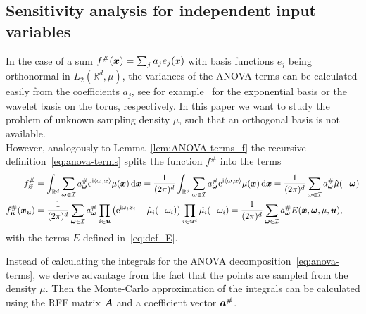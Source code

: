 \documentclass{article}
\renewcommand{\vec}[1]{\ensuremath \mathbf{\boldsymbol{#1}}}
\newcommand{\w}{\ensuremath{\vec \omega}}
\newcommand{\x}{\ensuremath{\vec x}}
\newcommand{\I}{\ensuremath{\mathcal{I}}}
\newcommand{\R}{\ensuremath{\mathbb{R}}}
\newcommand{\e}{\mathrm{e}}
\newcommand{\im}{\mathrm{i}}
\renewcommand{\d}{\, \mathrm{d}}
\theoremstyle{definition}
\numberwithin{equation}{section}
\begin{document}
\subsection{Sensitivity analysis for independent input variables }\label{sec:gsi1}
In the case of a sum $f^\#(\x) = \sum_j a_j e_j(x)$ with basis functions $e_j$ being orthonormal in $L_2(\R^d,\mu)$, the variances of the ANOVA terms can be calculated easily from the coefficients $a_j$, see for example~\cite{SchmischkeDiss,LiPoUl21} for the exponential basis or the wavelet basis on the torus, respectively. In this paper we want to study the problem of unknown sampling density $\mu$, such that an orthogonal basis is not available. \\ 
However, analogously to Lemma~\ref{lem:ANOVA-terms_f} the recursive definition~\eqref{eq:anova-terms} splits the function $f^\#$ into the terms
\begin{align*}
f^\#_{\varnothing} &= \int_{\R^d}  \sum_{\w\in \I} a^\#_{\w} \e^{\im\langle\w,\x\rangle }\mu(\x) \d \x= \frac{1}{(2\pi)^d}\int_{\R^d}  \sum_{\w\in \I} a^\#_{\w} \e^{\im\langle\w,\x\rangle }\mu(\x) \d \x 
= \frac{1}{(2\pi)^d}\sum_{\w\in \I} a^\#_{\w}\hat{\mu}(-\w)\\
f^\#_{\vec u}(\vec x_{\vec u}) &= \frac{1}{(2\pi)^d}\sum_{\w\in \I}a^\#_{\w} \prod_{i\in \vec u} \left(\e^{\im \omega_i x_i}- \hat{\mu}_i(-\omega_i)\right) \prod_{i \in \vec u^c} \hat{\mu_i}(-\omega_i) = \frac{1}{(2\pi)^d}\sum_{\w\in \I}a^\#_{\w} E(\x,\w,\mu,\vec u), 
\end{align*}
with the terms $E$ defined in~\eqref{eq:def_E}.


Instead of calculating the integrals for the ANOVA decomposition~\eqref{eq:anova-terms}, we derive advantage from the fact that the points are sampled from the density $\mu$. Then the Monte-Carlo approximation of the integrals can be calculated using the RFF matrix $\vec A$ and a coefficient vector $\vec a^\#$.\par
\end{document}

